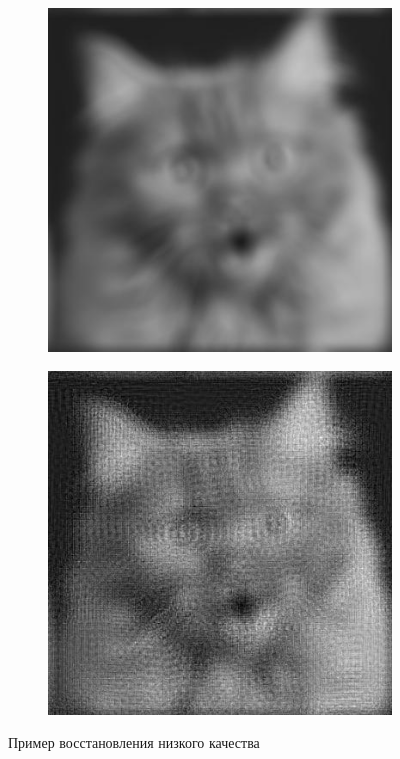 \begin{figure}[!h]
	\centering
	\begin{subfigure}{.5\textwidth}
		\centering
		\includegraphics[scale=0.5]{assets/cat_bad}
	\end{subfigure}%
	\begin{subfigure}{.5\textwidth}
		\centering
		\includegraphics[scale=0.66]{assets/cat_bad_result}
	\end{subfigure}
	\caption{Пример восстановления низкого качества}
	\label{expr10}
\end{figure}

